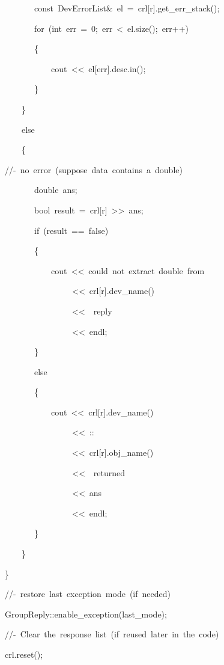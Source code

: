 \begin{lyxcode}
~~~~~~~const~DevErrorList\&~el~=~crl{[}r{]}.get\_err\_stack();

~~~~~~~for~(int~err~=~0;~err~<~el.size();~err++)

~~~~~~~\{

~~~~~~~~~~~cout~<\textcompwordmark{}<~el{[}err{]}.desc.in();

~~~~~~~\}

~~~~\}

~~~~else

~~~~\{

//-~no~error~(suppose~data~contains~a~double)

~~~~~~~double~ans;

~~~~~~~bool~result~=~crl{[}r{]}~>\textcompwordmark{}>~ans;

~~~~~~~if~(result~==~false)

~~~~~~~\{

~~~~~~~~~~~cout~<\textcompwordmark{}<~\textquotedbl{}could~not~extract~double~from~\textquotedbl{}

~~~~~~~~~~~~~~~~<\textcompwordmark{}<~crl{[}r{]}.dev\_name()

~~~~~~~~~~~~~~~~<\textcompwordmark{}<~\textquotedbl{}~reply\textquotedbl{}

~~~~~~~~~~~~~~~~<\textcompwordmark{}<~endl;

~~~~~~~\}

~~~~~~~else

~~~~~~~\{

~~~~~~~~~~~cout~<\textcompwordmark{}<~crl{[}r{]}.dev\_name()

~~~~~~~~~~~~~~~~<\textcompwordmark{}<~\textquotedbl{}::\textquotedbl{}

~~~~~~~~~~~~~~~~<\textcompwordmark{}<~crl{[}r{]}.obj\_name()

~~~~~~~~~~~~~~~~<\textcompwordmark{}<~\textquotedbl{}~returned~\textquotedbl{}

~~~~~~~~~~~~~~~~<\textcompwordmark{}<~ans

~~~~~~~~~~~~~~~~<\textcompwordmark{}<~endl;

~~~~~~~\}

~~~~\}

\}

//-~restore~last~exception~mode~(if~needed)

GroupReply::enable\_exception(last\_mode);

//-~Clear~the~response~list~(if~reused~later~in~the~code)

crl.reset();
\end{lyxcode}


